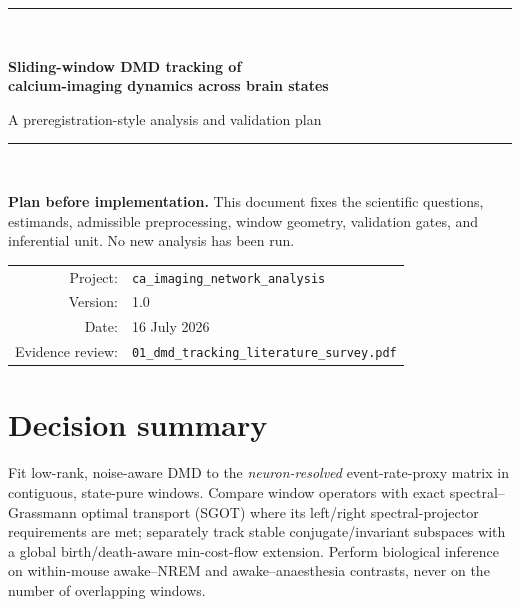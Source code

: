 \documentclass[11pt,a4paper]{article}
\begin{document}
\hypersetup{pageanchor=false}

\begin{titlepage}
  \centering
  \vspace*{1.8cm}
  {\color{navy}\rule{\textwidth}{1.2pt}}\\[1.0cm]
  {\Huge\bfseries Sliding-window DMD tracking of\\[0.2em]
  calcium-imaging dynamics across brain states\par}
  \vspace{0.6cm}
  {\Large A preregistration-style analysis and validation plan\par}
  \vspace{0.9cm}
  {\color{navy}\rule{\textwidth}{0.6pt}}\\[0.9cm]
  \begin{tcolorbox}[colback=pale,colframe=teal,width=0.92\textwidth,arc=2pt]
  \centering
  \textbf{Plan before implementation.} This document fixes the scientific questions, estimands, admissible preprocessing, window geometry, validation gates, and inferential unit. No new analysis has been run.
  \end{tcolorbox}
  \vfill
  \begin{tabular}{rl}
    Project: & \texttt{ca\_imaging\_network\_analysis}\\
    Version: & 1.0\\
    Date: & 16 July 2026\\
    Evidence review: & \texttt{01\_dmd\_tracking\_literature\_survey.pdf}
  \end{tabular}
  \vfill
\end{titlepage}

\hypersetup{pageanchor=true}
\tableofcontents
\clearpage
{}

\section{Decision summary}

\begin{decisionbox}
Fit low-rank, noise-aware DMD to the \emph{neuron-resolved} event-rate-proxy matrix in contiguous, state-pure windows. Compare window operators with exact spectral--Grassmann optimal transport (SGOT) where its left/right spectral-projector requirements are met; separately track stable conjugate/invariant subspaces with a global birth/death-aware min-cost-flow extension. Perform biological inference on within-mouse awake--NREM and awake--anaesthesia contrasts, never on the number of overlapping windows.
\end{decisionbox}
\end{document}
